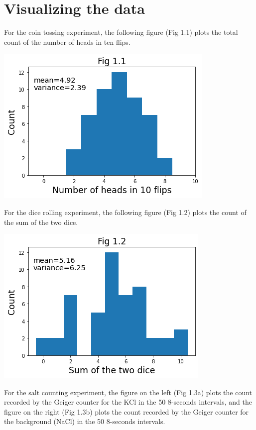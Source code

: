 \documentclass[11pt]{book}
\theoremstyle{break}
\theoremstyle{break}
\begin{document}
\section{Visualizing the data}
For the coin tossing experiment, the following figure (Fig 1.1) plots the total count of the number of heads in ten flips.
\begin{center}
\includegraphics[scale=0.5]{Fig1.1.png}
\end{center}
\hfill\break
For the dice rolling experiment, the following figure (Fig 1.2) plots the count of the sum of the two dice.
\begin{center}
\includegraphics[scale=0.5]{Fig1.2.png}
\end{center}
\hfill\break
For the salt counting experiment, the figure on the left (Fig 1.3a) plots the count recorded by the Geiger counter for the KCl in the 50 8-seconds intervals, and the figure on the right (Fig 1.3b) plots the count recorded by the Geiger counter for the background (NaCl) in the 50 8-seconds intervals.
\end{document}
